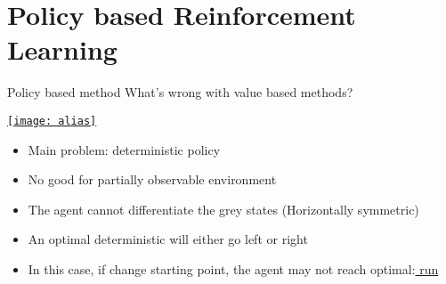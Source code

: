 \graphicspath{{./figs/repo/}{./figs/}}
\section{Policy based Reinforcement Learning}

\iffalse
\begin{frame}{Policy based method}
    Value based method (previous sildes):
    \begin{itemize}
        \item Main focus is on state-action value evaluation
        \item Policy improvement is based on greedy or $\epsilon$-greedy strategy w.r.t state-action values
        \item Return deterministic policy
    \end{itemize}\vspace{0.5cm}
    Policy based method (slides after this page):
    \begin{itemize}
        \item Policy is a function of observations
        \item Policy improvement is based on gradient w.r.t some objective function
        \item State-action value not neccessary for policy updates
        \item Return stochastic policy
    \end{itemize}
\end{frame}
\fi

\begin{frame}{Policy based method}
    What's wrong with value based methods?\\\vspace{0.2cm}
    \begin{center} \href{https://www.youtube.com/watch?v=pKkbf9hnvXY}{\texttt{[image: alias]}}\end{center}
    \begin{itemize}
        \item Main problem: deterministic policy
        \item No good for partially observable environment
        \item The agent cannot differentiate the grey states (Horizontally symmetric)
        \item An optimal deterministic will either go left or right 
        \item In this case, if change starting point, the agent may not reach optimal:\href{https://www.youtube.com/watch?v=hCnGoKwcAhQ}{ run}
    \end{itemize}
\end{frame}

